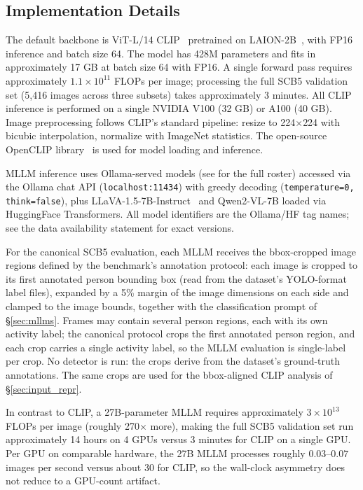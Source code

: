 \documentclass[11pt,a4paper]{article}
\begin{document}
\subsection{Implementation Details}

The default backbone is ViT-L/14 CLIP~\cite{radford2021clip} pretrained on LAION-2B~\cite{schuhmann2022laion5b}, with FP16 inference and batch size 64. The model has 428M parameters and fits in approximately 17 GB at batch size 64 with FP16. A single forward pass requires approximately $1.1 \times 10^{11}$ FLOPs per image; processing the full SCB5 validation set (5{,}416 images across three subsets) takes approximately 3 minutes. All CLIP inference is performed on a single NVIDIA V100 (32 GB) or A100 (40 GB). Image preprocessing follows CLIP's standard pipeline: resize to 224$\times$224 with bicubic interpolation, normalize with ImageNet statistics. The open-source OpenCLIP library~\cite{cherti2023reproducible} is used for model loading and inference.

MLLM inference uses Ollama-served models (see  for the full roster) accessed via the Ollama chat API (\texttt{localhost:11434}) with greedy decoding (\texttt{temperature=0, think=false}), plus LLaVA-1.5-7B-Instruct~\cite{liu2023visual} and Qwen2-VL-7B loaded via HuggingFace Transformers. All model identifiers are the Ollama/HF tag names; see the data availability statement for exact versions.

For the canonical SCB5 evaluation, each MLLM receives the bbox-cropped image regions defined by the benchmark's annotation protocol: each image is cropped to its first annotated person bounding box (read from the dataset's YOLO-format label files), expanded by a 5\% margin of the image dimensions on each side and clamped to the image bounds, together with the classification prompt of \S\ref{sec:mllms}. Frames may contain several person regions, each with its own activity label; the canonical protocol crops the first annotated person region, and each crop carries a single activity label, so the MLLM evaluation is single-label per crop. No detector is run: the crops derive from the dataset's ground-truth annotations. The same crops are used for the bbox-aligned CLIP analysis of \S\ref{sec:input_repr}.

In contrast to CLIP, a 27B-parameter MLLM requires approximately $3 \times 10^{13}$ FLOPs per image (roughly 270$\times$ more), making the full SCB5 validation set run approximately 14 hours on 4 GPUs versus 3 minutes for CLIP on a single GPU. Per GPU on comparable hardware, the 27B MLLM processes roughly $0.03$--$0.07$ images per second versus about 30 for CLIP, so the wall-clock asymmetry does not reduce to a GPU-count artifact.
\end{document}
